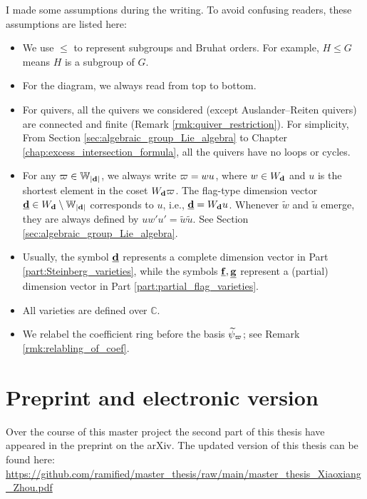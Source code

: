 \begin{warning}
I made some assumptions during the writing. To avoid confusing readers, these assumptions are listed here:
\begingroup
{}
\begin{itemize}
\item We use $\leqslant$ to represent subgroups and Bruhat orders. For example, $H \leqslant G$ means $H$ is a subgroup of $G$.

\item For the diagram, we always read from top to bottom.



\item For quivers, all the quivers we considered (except Auslander--Reiten quivers) are connected and finite (Remark \ref{rmk:quiver_restriction}). For simplicity, From Section \ref{sec:algebraic_group_Lie_algebra} to Chapter \ref{chap:excess_intersection_formula}, all the quivers have no loops or cycles.

\item  For any $\varpi \in \mathbb{W}_{|\mathbf{d}|}$, we always write $\varpi = wu$, where $w \in W_{\mathbf{d}}$ and $u$ is the shortest element in the coset $W_{\mathbf{d}} \varpi$. The flag-type dimension vector $\underline{\mathbf{d}} \in W_{\mathbf{d}} \setminus \mathbb{W}_{|\mathbf{d}|}$ corresponds to $u$, i.e., $\underline{\mathbf{d}}=W_{\mathbf{d}} u$. Whenever $\tilde{w}$ and $\tilde{u}$ emerge, they are always defined by $uw'u'=\tilde{w}\tilde{u}$. See Section \ref{sec:algebraic_group_Lie_algebra}. 

\item Usually, the symbol $\underline{\mathbf{d}}$ represents a complete   dimension vector in Part \ref{part:Steinberg_varieties}, while the symbols $\underline{\mathbf{f}}, \underline{\mathbf{g}}$ represent a (partial) dimension vector in Part \ref{part:partial_flag_varieties}.

\item All varieties are defined over $\mathbb{C}$. 

\item We relabel the coefficient ring before the basis $\widetilde{\psi}_{\varpi}$; see Remark \ref{rmk:relabling_of_coef}.
\end{itemize}
\endgroup
\end{warning}

\section*{Preprint and electronic version}
Over the course of this master project the second part of this thesis have appeared in the preprint \cite{zhou2022affine} on the arXiv. The updated version of this thesis can be found here:  \href{https://github.com/ramified/master_thesis/raw/main/master_thesis_Xiaoxiang_Zhou.pdf}{https://github.com/ramified/master\_thesis/raw/main/master\_thesis\_Xiaoxiang\_Zhou.pdf}